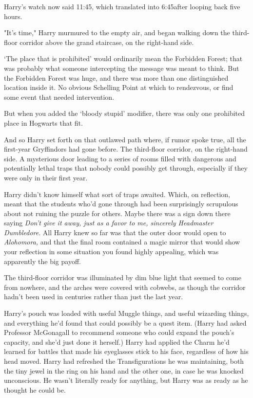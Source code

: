 Harry's watch now said 11:45, which translated into 6:45\PM after looping back
five hours.

"It's time," Harry murmured to the empty air, and began walking down the
third-floor corridor above the grand staircase, on the right-hand side.

`The place that is prohibited' would ordinarily mean the Forbidden Forest; that
was probably what someone intercepting the message was meant to think. But the
Forbidden Forest was huge, and there was more than one distinguished location
inside it. No obvious Schelling Point at which to rendezvous, or find some
event that needed intervention.

But when you added the `bloody stupid' modifier, there was only one prohibited
place in Hogwarts that fit.

And so Harry set forth on that outlawed path where, if rumor spoke true, all
the first-year Gryffindors had gone before. The third-floor corridor, on the
right-hand side. A mysterious door leading to a series of rooms filled with
dangerous and potentially lethal traps that nobody could possibly get through,
especially if they were only in their first year.

Harry didn't know himself what sort of traps awaited. Which, on reflection,
meant that the students who'd gone through had been surprisingly scrupulous
about not ruining the puzzle for others. Maybe there was a sign down there
saying \emph{Don't give it away, just as a favor to me, sincerely Headmaster
Dumbledore}. All Harry knew so far was that the outer door would open to
\emph{Alohomora,} and that the final room contained a magic mirror that would
show your reflection in some situation you found highly appealing, which was
apparently the big payoff.

The third-floor corridor was illuminated by dim blue light that seemed to come
from nowhere, and the arches were covered with cobwebs, as though the corridor
hadn't been used in centuries rather than just the last year.

Harry's pouch was loaded with useful Muggle things, and useful wizarding
things, and everything he'd found that could possibly be a quest item. (Harry
had asked Professor McGonagall to recommend someone who could expand the
pouch's capacity, and she'd just done it herself.) Harry had applied the Charm
he'd learned for battles that made his eyeglasses stick to his face, regardless
of how his head moved. Harry had refreshed the Transfigurations he was
maintaining, both the tiny jewel in the ring on his hand and the other one, in
case he was knocked unconscious. He wasn't literally ready for anything, but
Harry was as ready as he thought he could be.

